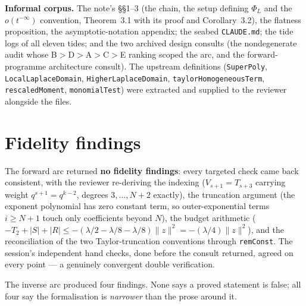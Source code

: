 \documentclass[11pt]{article}
\begin{document}
\textbf{Informal corpus.} The note's \S\S1--3 (the chain, the setup defining
$\Phi_L$ and the $o(t^{-\infty})$ convention, Theorem~3.1 with its proof and
Corollary~3.2), the flatness proposition, the asymptotic-notation appendix;
the seabed \texttt{CLAUDE.md}; the tide logs of all eleven tides; and the two
archived design consults (the nondegenerate audit whose B$>$D$>$A$>$C$>$E
ranking scoped the arc, and the forward-programme architecture consult). The
upstream definitions (\texttt{SuperPoly}, \texttt{LocalLaplaceDomain},
\texttt{HigherLaplaceDomain}, \texttt{taylorHomogeneousTerm},
\texttt{rescaledMoment}, \texttt{monomialTest}) were extracted and supplied
to the reviewer alongside the files.

\section{Fidelity findings}

The forward arc returned \textbf{no fidelity findings}: every targeted check
came back consistent, with the reviewer re-deriving the indexing ($V_{s+1} =
T_{s+3}$ carrying weight $q^{s+1} = q^{k-2}$, degrees $3,\dots,N{+}2$
exactly), the truncation argument (the exponent polynomial has zero constant
term, so outer-exponential terms $i\ge N{+}1$ touch only coefficients beyond
$N$), the budget arithmetic ($-T_2 + |S| + |R| \le -(\lambda/2 - \lambda/8 -
\lambda/8)\|z\|^2 = -(\lambda/4)\|z\|^2$), and the reconciliation of the two
Taylor-truncation conventions through \texttt{remConst}. The session's
independent hand checks, done before the consult returned, agreed on every
point --- a genuinely convergent double verification.

The inverse arc produced four findings. None says a proved statement is
false; all four say the formalisation is \emph{narrower} than the prose
around it.
\end{document}
